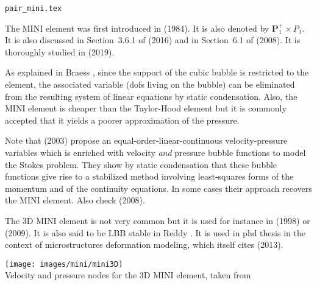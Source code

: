 \begin{flushright} {\tiny {\color{gray} \tt pair\_mini.tex}} \end{flushright}

\noindent
\begin{minipage}{0.48\textwidth}
The  MINI element was first introduced in 
\textcite{arbf84} (1984). It is also denoted by ${\bm P}_1^+\times P_1$.
It is also discussed in Section~3.6.1 of \textcite{john16} (2016) and in Section~6.1 
of \textcite{bobf08} (2008). It is thoroughly studied in \textcite{cibo19} (2019).

As explained in Braess \cite{braess}, since the support of the cubic bubble is restricted to the element, 
the associated variable (dofs living on the bubble) can be eliminated from the resulting 
system of linear equations by static condensation. 
Also, the MINI element is cheaper than the Taylor-Hood element but it is commonly accepted
that it yields a poorer approximation of the pressure.
\end{minipage}\hfill
\begin{minipage}{0.48\textwidth}

\end{minipage}

\begin{remark}
Note that \textcite{frol03} (2003) propose an equal-order-linear-continuous 
velocity-pressure variables which is enriched 
with velocity {\it and} pressure bubble functions to model the Stokes problem. 
They show by static condensation that
these bubble functions give rise to a stabilized method involving least-squares forms of 
the momentum and of the
continuity equations. In some cases their approach recovers 
the MINI element. Also check \textcite{gamt08} (2008).
\end{remark}

The 3D MINI element is not very common but it is used for instance in \textcite{pico98} (1998) or
\textcite{tokv09} (2009). 
It is also said to be LBB stable in Reddy \cite[p180]{reddybook2}.
It is used in \cite{furstoss} phd thesis in the context of microstructures deformation modeling, 
which itself cites \textcite{camb13} (2013).

\begin{center}
\texttt{[image: images/mini/mini3D]}\\
{\captionfont Velocity and pressure nodes for the 3D MINI element, taken from \cite{pico98}}
\end{center}

